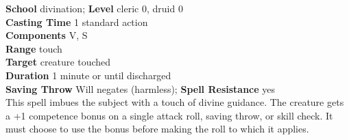 \textbf{School} divination; \textbf{Level} cleric 0, druid 0\\
\textbf{Casting Time} 1 standard action\\
\textbf{Components} V, S\\
\textbf{Range} touch\\
\textbf{Target} creature touched\\
\textbf{Duration} 1 minute or until discharged\\
\textbf{Saving Throw }Will negates (harmless); \textbf{Spell Resistance} yes\\
This spell imbues the subject with a touch of divine guidance. The creature gets a +1 competence bonus on a single attack roll, saving throw, or skill check. It must choose to use the bonus before making the roll to which it applies.\\
